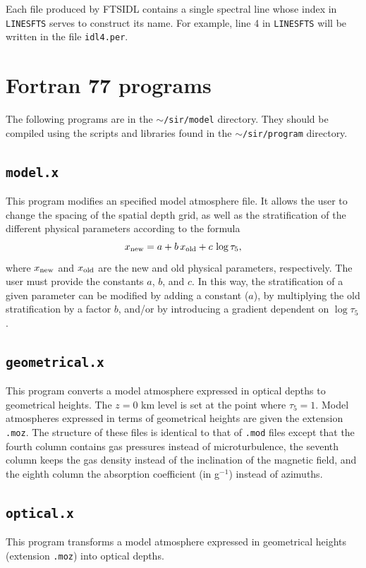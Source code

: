 \documentclass[11pt]{report}
\begin{document}
Each file produced by FTSIDL contains a single spectral line whose index
in {\tt LINESFTS} serves to construct its name. For example,
line 4 in {\tt LINESFTS} will be written in the file {\tt idl4.per}.

\section{Fortran 77 programs} 
The following programs are in the {\tt $\sim$/sir/model} directory.
They should be compiled using the scripts and libraries found in 
the {\tt $\sim$/sir/program} directory.
 

\subsection{{\tt model.x}}
This program modifies an specified model atmosphere file. It allows
the user to change the spacing of the spatial depth grid, as well as 
the stratification of the different physical parameters according to
the formula
\begin{displaymath}
x_{\rm new} = a + b \, x_{\rm old} + c \, \log {\tau_5},
\end{displaymath}
where $x_{\rm new}$ and $x_{\rm old}$ are the new and old physical
parameters, respectively. The user must provide the constants $a$, $b$, and
$c$. In this way, the stratification of a given parameter can be modified
by adding a constant ($a$), by multiplying the old stratification by a
factor $b$, and/or by introducing a gradient dependent on $\log \tau_5$.

\subsection{{\tt geometrical.x}}
This program converts a model atmosphere expressed in optical depths
to geometrical heights. The $z=0$ km level is set at the point where
$\tau_5 =1$. Model atmospheres expressed in terms of geometrical heights
are given the extension {\tt .moz}. The structure of these files is
identical to that of {\tt .mod} files except that the fourth column
contains gas pressures instead of microturbulence, the seventh column
keeps the gas density instead of the inclination of the magnetic field, and
the eighth column the absorption coefficient (in g$^{-1}$) instead of
azimuths. 

\subsection{{\tt optical.x}}
This program transforms a model atmosphere expressed in geometrical
heights (extension {\tt .moz}) into optical depths.   
\end{document}
